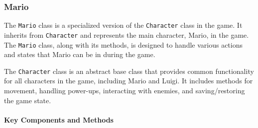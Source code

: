 \subsubsection{\large Mario}
The \texttt{Mario} class is a specialized version of the \texttt{Character} class in the game. It inherits from \texttt{Character} and represents the main character, Mario, in the game. The \texttt{Mario} class, along with its methods, is designed to handle various actions and states that Mario can be in during the game.

The \texttt{Character} class is an abstract base class that provides common functionality for all characters in the game, including Mario and Luigi. It includes methods for movement, handling power-ups, interacting with enemies, and saving/restoring the game state.

\paragraph{Key Components and Methods}
